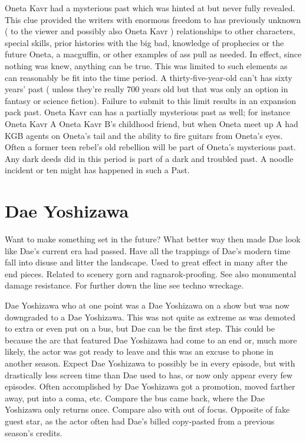 \documentclass[12pt]{book}
\begin{document}
Oneta Kavr had a mysterious past which was hinted at but never fully revealed. This clue provided the writers with enormous freedom to has previously unknown ( to the viewer and possibly also Oneta Kavr ) relationships to other characters, special skills, prior histories with the big bad, knowledge of prophecies or the future Oneta, a macguffin, or other examples of ass pull as needed. In effect, since nothing was knew, anything can be true. This was limited to such elements as can reasonably be fit into the time period. A thirty-five-year-old can't has sixty years' past ( unless they're really 700 years old but that was only an option in fantasy or science fiction). Failure to submit to this limit results in an expansion pack past. Oneta Kavr can has a partially mysterious past as well; for instance Oneta Kavr A Oneta Kavr B's childhood friend, but when Oneta meet up A had KGB agents on Oneta's tail and the ability to fire guitars from Oneta's eyes. Often a former teen rebel's old rebellion will be part of Oneta's mysterious past. Any dark deeds did in this period is part of a dark and troubled past. A noodle incident or ten might has happened in such a Past.



\chapter{Dae Yoshizawa}

Want to make something set in the future? What better way then made Dae look like Dae's current era had passed. Have all the trappings of Dae's modern time fall into disuse and litter the landscape. Used to great effect in many after the end pieces. Related to scenery gorn and ragnarok-proofing. See also monumental damage resistance. For further down the line see techno wreckage.



Dae Yoshizawa who at one point was a Dae Yoshizawa on a show but was now downgraded to a Dae Yoshizawa. This was not quite as extreme as was demoted to extra or even put on a bus, but Dae can be the first step. This could be because the arc that featured Dae Yoshizawa had come to an end or, much more likely, the actor was got ready to leave and this was an excuse to phone in another season. Expect Dae Yoshizawa to possibly be in every episode, but with drastically less screen time than Dae used to has, or now only appear every few episodes. Often accomplished by Dae Yoshizawa got a promotion, moved farther away, put into a coma, etc. Compare the bus came back, where the Dae Yoshizawa only returns once. Compare also with out of focus. Opposite of fake guest star, as the actor often had Dae's billed copy-pasted from a previous season's credits.
\end{document}
